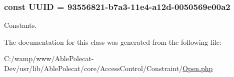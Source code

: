 \subsubsection[{U\+U\+I\+D}]{\setlength{\rightskip}{0pt plus 5cm}const U\+U\+I\+D = \textquotesingle{}93556821-\/b7a3-\/11e4-\/a12d-\/0050569e00a2\textquotesingle{}}\label{class_able_polecat___access_control___constraint___open_a74b892c8c0b86bf9d04c5819898c51e7}
Constants. 

The documentation for this class was generated from the following file\+:\begin{DoxyCompactItemize}
\item 
C\+:/wamp/www/\+Able\+Polecat-\/\+Dev/usr/lib/\+Able\+Polecat/core/\+Access\+Control/\+Constraint/\hyperlink{_open_8php}{Open.\+php}\end{DoxyCompactItemize}
